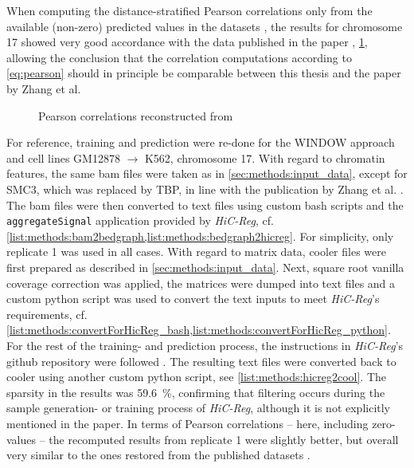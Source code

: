 When computing the distance-stratified Pearson correlations only from the available (non-zero) predicted values in the datasets \cite{ShiluZhang2019,ShiluZhang2019a},
the results for chromosome 17 showed very good accordance with the data published in the paper \cite[fig.\,10]{Zhang2019}, \cref{fig:methods:zhang_correlations_reconstructed},
allowing the conclusion that the correlation computations according to \cref{eq:pearson} should in principle be comparable between this thesis and the paper by Zhang et al.
\begin{figure}[htbp]
 \begin{subfigure}{0.45\textwidth}
 \end{subfigure}\hfill
 \begin{subfigure}{0.45\textwidth}
 \end{subfigure}
\caption{Pearson correlations reconstructed from \cite{Zhang2019,ShiluZhang2019,ShiluZhang2019a}} \label{fig:methods:zhang_correlations_reconstructed}
\end{figure}

For reference, training and prediction were re-done for the WINDOW approach and cell lines GM12878 $\rightarrow$ K562, chromosome 17.
With regard to chromatin features, the same bam files were taken as in \cref{sec:methods:input_data}, except for SMC3, which was replaced by TBP,
in line with the publication by Zhang et al. \cite{Zhang2019}. 
The bam files were then converted to text files using custom bash scripts and the \texttt{aggregateSignal} application provided by \emph{HiC-Reg}, 
cf. \cref{list:methods:bam2bedgraph,list:methods:bedgraph2hicreg}. 
For simplicity, only replicate 1 was used in all cases.
With regard to matrix data, cooler files were first prepared as described in \cref{sec:methods:input_data}.
Next, square root vanilla coverage correction was applied, the matrices were dumped into text files and a custom python script was used
to convert the text inputs to meet \emph{HiC-Reg}'s requirements, cf. \cref{list:methods:convertForHicReg_bash,list:methods:convertForHicReg_python}.
For the rest of the training- and prediction process, the instructions in \emph{HiC-Reg}'s github repository were followed \cite{Zhang2019}.
The resulting text files were converted back to cooler using another custom python script, see \cref{list:methods:hicreg2cool}.
The sparsity in the results was \SI{59.6}{\percent}, confirming that filtering occurs during the sample generation- or training process of \emph{HiC-Reg},
although it is not explicitly mentioned in the paper.
In terms of Pearson correlations -- here, including zero-values -- the recomputed results from replicate 1 were slightly better,
but overall very similar to the ones restored from the published datasets \cite{ShiluZhang2019,ShiluZhang2019a}. 

